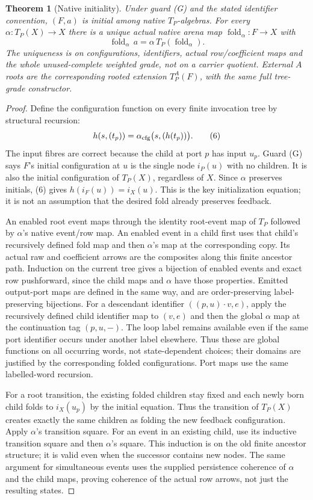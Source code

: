 \documentclass[11pt]{article}
\newtheorem{theorem}{Theorem}\newtheorem{proposition}[theorem]{Proposition}
\begin{document}
\begin{theorem}[Native initiality]
Under guard (G) and the stated identifier convention, $(F,a)$ is initial among native $T_P$-algebras. For every $\alpha:T_P(X)\to X$ there is a unique actual native arena map $\operatorname{fold}_\alpha:F\to X$ with
\[
 \operatorname{fold}_\alpha\,a
 =\alpha\,T_P(\operatorname{fold}_\alpha).                 \tag{5}
\]
The uniqueness is on configurations, identifiers, actual row/coefficient maps and the whole unused-complete weighted grade, not on a carrier quotient. External $A$ roots are the corresponding rooted extension $T_P^A(F)$, with the same full tree-grade constructor.
\end{theorem}
\begin{proof}
Define the configuration function on every finite invocation tree by structural recursion:
\[
 h(s,(t_p))=\alpha_{\rm cfg}\bigl(s,(h(t_p))\bigr).         \tag{6}
\]
The input fibres are correct because the child at port $p$ has input $u_p$. Guard (G) says $F$'s initial configuration at $u$ is the single node $i_P(u)$ with no children. It is also the initial configuration of $T_P(X)$, regardless of $X$. Since $\alpha$ preserves initials, (6) gives $h(i_F(u))=i_X(u)$. This is the key initialization equation; it is not an assumption that the desired fold already preserves feedback.

An enabled root event maps through the identity root-event map of $T_P$ followed by $\alpha$'s native event/row map. An enabled event in a child first uses that child's recursively defined fold map and then $\alpha$'s map at the corresponding copy. Its actual raw and coefficient arrows are the composites along this finite ancestor path. Induction on the current tree gives a bijection of enabled events and exact row pushforward, since the child maps and $\alpha$ have those properties. Emitted output-port maps are defined in the same way, and are order-preserving label-preserving bijections. For a descendant identifier $((p,u)\cdot v,e)$, apply the recursively defined child identifier map to $(v,e)$ and then the global $\alpha$ map at the continuation tag $(p,u,-)$. The loop label remains available even if the same port identifier occurs under another label elsewhere. Thus these are global functions on all occurring words, not state-dependent choices; their domains are justified by the corresponding folded configurations. Port maps use the same labelled-word recursion.

For a root transition, the existing folded children stay fixed and each newly born child folds to $i_X(u_p)$ by the initial equation. Thus the transition of $T_P(X)$ creates exactly the same children as folding the new feedback configuration. Apply $\alpha$'s transition square. For an event in an existing child, use its inductive transition square and then $\alpha$'s square. This induction is on the old finite ancestor structure; it is valid even when the successor contains new nodes. The same argument for simultaneous events uses the supplied persistence coherence of $\alpha$ and the child maps, proving coherence of the actual row arrows, not just the resulting states.


\end{proof}
\end{document}

